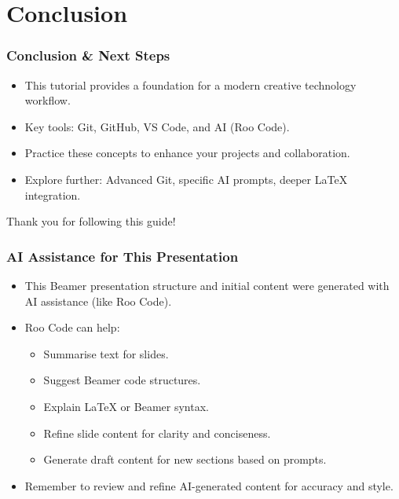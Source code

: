\documentclass{beamer}
\begin{document}
\section{Conclusion}
\begin{frame}
  \frametitle{Conclusion & Next Steps}
  \begin{itemize}
    \item This tutorial provides a foundation for a modern creative technology workflow.
    \item Key tools: Git, GitHub, VS Code, and AI (Roo Code).
    \item Practice these concepts to enhance your projects and collaboration.
    \item Explore further: Advanced Git, specific AI prompts, deeper LaTeX integration.
  \end{itemize}
  \vfill
  \centering
  Thank you for following this guide!
\end{frame}

\begin{frame}
  \frametitle{AI Assistance for This Presentation}
  \begin{itemize}
    \item This Beamer presentation structure and initial content were generated with AI assistance (like Roo Code).
    \item Roo Code can help:
    \begin{itemize}
        \item Summarise text for slides.
        \item Suggest Beamer code structures.
        \item Explain LaTeX or Beamer syntax.
        \item Refine slide content for clarity and conciseness.
        \item Generate draft content for new sections based on prompts.
    \end{itemize}
    \item Remember to review and refine AI-generated content for accuracy and style.
  \end{itemize}
\end{frame}
\end{document}
